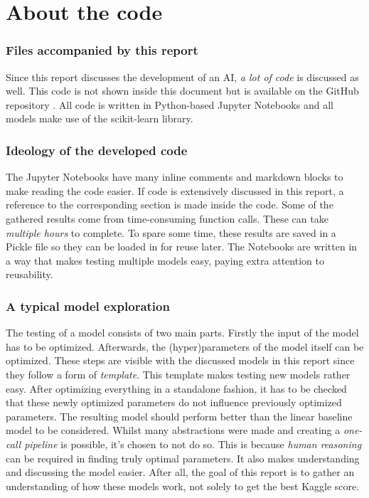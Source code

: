 \part{About the code}
\label{part:about_the_code}


\section{Files accompanied by this report}
\label{section:inc_files}
Since this report discusses the development of an AI, \textit{a lot of code} is discussed as well.
This code is not shown inside this document but is available on the GitHub repository \citep{github_project}.
All code is written in Python-based Jupyter Notebooks and all models make use of the scikit-learn library.



\section{Ideology of the developed code}
\label{section:ideology_dev_code}
The Jupyter Notebooks have many inline comments and markdown blocks to make reading the code easier.
If code is extensively discussed in this report, a reference to the corresponding section is made inside the code. 
Some of the gathered results come from time-consuming function calls.
These can take \textit{multiple hours} to complete.
To spare some time, these results are saved in a Pickle file so they can be loaded in for reuse later.
The Notebooks are written in a way that makes testing multiple models easy, paying extra attention to reusability. 


\section{A typical model exploration}
\label{section:typical_model_exploration}
The testing of a model consists of two main parts.
Firstly the input of the model has to be optimized.
Afterwards, the (hyper)parameters of the model itself can be optimized.
These steps are visible with the discussed models in this report since they follow a form of \emph{template}.
This template makes testing new models rather easy.
After optimizing everything in a standalone fashion, it has to be checked that these newly optimized parameters do not influence previously optimized parameters.
The resulting model should perform better than the linear baseline model to be considered.
Whilst many abstractions were made and creating a \emph{one-call pipeline} is possible, it's chosen to not do so.
This is because \textit{human reasoning} can be required in finding truly optimal parameters.
It also makes understanding and discussing the model easier.
After all, the goal of this report is to gather an understanding of how these models work, not solely to get the best Kaggle score.

